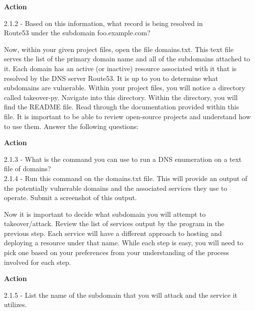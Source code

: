 \documentclass[letterpaper,12pt]{report}
\begin{document}
\bigskip
\begin{mdframed}[backgroundcolor=blue!10,style=code,nobreak=true,align=center,userdefinedwidth=14cm]
    \textbf{Action}
    \bigskip
    
    2.1.2 - Based on this information, what record is being resolved in \\Route53 under the subdomain foo.example.com?
\end{mdframed}

Now, within your given project files, open the file domains.txt. This text file serves the list of the primary domain name and all of the subdomains attached to it. Each domain has an active (or inactive) resource associated with it that is resolved by the DNS server Route53. It is up to you to determine what subdomains are vulnerable. Within your project files, you will notice a directory called takeover-py. Navigate into this directory. Within the directory, you will find the README file. Read through the documentation provided within this file. It is important to be able to review open-source projects and understand how to use them. Answer the following questions:

\bigskip
\begin{mdframed}[backgroundcolor=blue!10,style=code,nobreak=true,align=center,userdefinedwidth=14cm]
    \textbf{Action}
    \bigskip
    
     2.1.3 - What is the command you can use to run a DNS enumeration on a text file of domains?\\
     2.1.4 - Run this command on the domains.txt file. This will provide an output of the potentially vulnerable domains and the associated services they use to operate. Submit a screenshot of this output.
\end{mdframed}

Now it is important to decide what subdomain you will attempt to \\takeover/attack. Review the list of services output by the program in the previous step. Each service will have a different approach to hosting and deploying a resource under that name. While each step is easy, you will need to pick one based on your preferences from your understanding of the process involved for each step.

\bigskip
\begin{mdframed}[backgroundcolor=blue!10,style=code,nobreak=true,align=center,userdefinedwidth=14cm]
    \textbf{Action}
    \bigskip
    
    2.1.5 - List the name of the subdomain that you will attack and the service it utilizes.
\end{mdframed}
\end{document}
